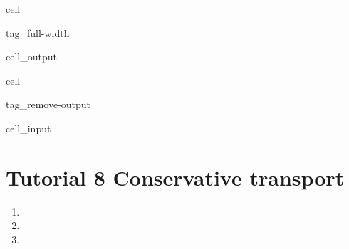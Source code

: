 \documentclass[letterpaper,10pt,english]{jupyterBook}
\begin{document}
\begin{sphinxuseclass}{cell}
\begin{sphinxuseclass}{tag_full-width}
\begin{sphinxVerbatimOutput}
\begin{sphinxuseclass}{cell_output}
\end{sphinxuseclass}\end{sphinxVerbatimOutput}

\end{sphinxuseclass}
\end{sphinxuseclass}
\sphinxstepscope

\begin{sphinxuseclass}{cell}
\begin{sphinxuseclass}{tag_remove-output}\begin{sphinxVerbatimInput}

\begin{sphinxuseclass}{cell_input}
\begin{sphinxVerbatim}[commandchars=\\\{\}]
   
   
    
   
\end{sphinxVerbatim}

\end{sphinxuseclass}\end{sphinxVerbatimInput}

\end{sphinxuseclass}
\end{sphinxuseclass}

\chapter{Tutorial 8 \sphinxhyphen{} Conservative transport}
\label{\detokenize{content/tutorials/T8/tutorial_08:tutorial-8-conservative-transport}}\label{\detokenize{content/tutorials/T8/tutorial_08::doc}}

\begin{enumerate}
%
\item {} 
\sphinxAtStartPar
{}


\item {} 
\sphinxAtStartPar
{}


\item {} 
\sphinxAtStartPar
{}

\end{enumerate}
\end{document}
